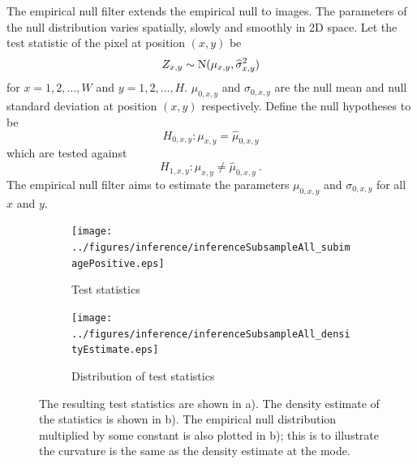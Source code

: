The empirical null filter extends the empirical null to images. The parameters of the null distribution varies spatially, slowly and smoothly in 2D space. Let the test statistic of the pixel at position $(x,y)$ be
\begin{equation}
Z_{x,y}\sim\operatorname{N}(\mu_{x,y},\widehat{\sigma}_{x,y}^2)
\end{equation}
for $x=1,2,\dotsc,W$ and $y=1,2,\dotsc,H$. $\mu_{0,x,y}$ and $\sigma_{0,x,y}$ are the null mean and null standard deviation at position $(x,y)$ respectively. Define the null hypotheses to be
\begin{equation}
  H_{0,x,y}:\mu_{x,y}=\widehat{\mu}_{0,x,y}
\end{equation}
which are tested against
\begin{equation}
  H_{1,x,y}:\mu_{x,y}\neq\widehat{\mu}_{0,x,y} \ .
\end{equation}
 The empirical null filter aims to estimate the parameters $\mu_{0,x,y}$ and $\sigma_{0,x,y}$ for all $x$ and $y$.
 
 \begin{figure}[t]
  \centering
  \begin{subfigure}[b]{\subSize}
    \texttt{[image: ../figures/inference/inferenceSubsampleAll\_subimagePositive.eps]}
    \caption{Test statistics}
  \end{subfigure}
  \begin{subfigure}[b]{\subSize}
    \texttt{[image: ../figures/inference/inferenceSubsampleAll\_densityEstimate.eps]}
    \caption{Distribution of test statistics}
  \end{subfigure}
  \caption{The resulting test statistics are shown in a). The density estimate of the statistics is shown in b). The empirical null distribution multiplied by some constant is also plotted in b); this is to illustrate the curvature is the same as the density estimate at the mode.}
  \label{fig:inference_inferenceSubsampleAll}
\end{figure}

